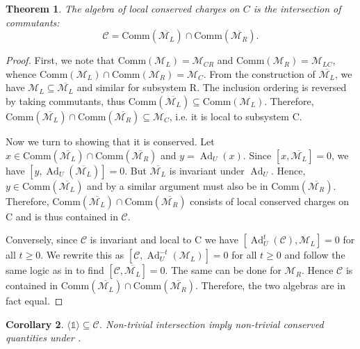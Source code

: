 \documentclass[11pt, twocolumn, floatfix, superscriptaddress, aps, prb, raggedbottom]{revtex4-2}
\newtheorem{theorem}{Theorem}[section]
\newtheorem{corollary}[theorem]{Corollary}
\newcommand{\comm}{\mathrm{Comm}}
\newcommand{\Id}{\mathds{1}}
\DeclareMathOperator{\Ad}{Ad}
\begin{document}
\begin{theorem}
    The algebra of local conserved charges on $C$ is the intersection of commutants: \begin{equation}\mathcal
    C = \comm\left ({\overline{\mathcal{M}_L}} \right) \cap \comm\left ({\overline{\mathcal{M}_R}} \right).\end{equation}
    \label{thm:central_conserved_charge}
\end{theorem}
\begin{proof}
    First, we note that $\comm(\mathcal{M}_L) = \mathcal{M}_{CR}$ and $\comm(\mathcal{M}_R) = \mathcal{M}_{LC}$, whence $\comm(\mathcal{M}_L) \cap \comm(\mathcal{M}_R) = \mathcal{M}_C$.
    From the construction of $\overline{\mathcal{M}_L}$, we have $\mathcal{M}_L \subseteq \overline{\mathcal{M}_L}$ and similar for subsystem R.
    The inclusion ordering is reversed by taking commutants, thus $\comm(\overline{\mathcal{M}_L}) \subseteq \comm(\mathcal{M}_L)$.
    Therefore, $\comm(\overline{\mathcal{M}_L}) \cap \comm(\overline{\mathcal{M}_R}) \subseteq \mathcal{M}_C$, i.e. it is local to subsystem C.

    Now we turn to showing that it is conserved.
    Let $x \in \comm(\overline{\mathcal{M}_L}) \cap \comm(\overline{\mathcal{M}_R})$ and $y = \Ad_U(x)$.
    Since $[x, \overline{\mathcal{M}_L}] = 0$, we have $[y, \Ad_U \left(\overline{\mathcal{M}_L}\right)] = 0$.
    But $\overline{\mathcal{M}_L}$ is invariant under $\Ad_U$.
    Hence, $y \in \comm(\overline{\mathcal{M}_L})$ and by a similar argument must also be in $\comm(\overline{\mathcal{M}_R})$.
    Therefore, $\comm(\overline{\mathcal{M}_L}) \cap \comm(\overline{\mathcal{M}_R})$ consists of local conserved charges on C and is thus contained in $\mathcal{C}$.

    Conversely, since $\mathcal{C}$ is invariant and local to C we have $[\Ad_U^t (\mathcal{C}), \mathcal{M}_L] = 0$ for all $t \ge 0$.
    We rewrite this as $[\mathcal{C}, \Ad_U^{-t} (\mathcal{M}_L)] = 0$ for all $t \ge 0$ and follow the same logic as in  to find $[\mathcal{C}, \overline{\mathcal{M}_L}] = 0$. The same can be done for $\mathcal{M}_R$.
    Hence $\mathcal{C}$ is contained in $\comm(\overline{\mathcal{M}_L}) \cap \comm(\overline{\mathcal{M}_R})$.
    Therefore, the two algebras are in fact equal.
\end{proof}
\begin{corollary}
    $\langle \Id \rangle \subseteq \mathcal{C}$. Non-trivial intersection imply non-trivial conserved quantities under . 
\end{corollary}
\end{document}
